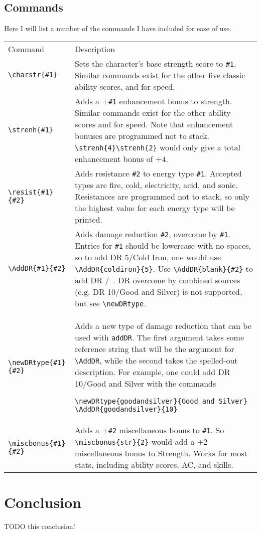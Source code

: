 \documentclass[oneside]{article}
\begin{document}
\subsection{Commands}
Here I will list a number of the commands I have included for ease of use.
\begin{tabular}{lp{8cm}}
Command & Description\\
\verb|\charstr{#1}| & Sets the character's base strength score to \verb|#1|. Similar commands exist for the other five classic ability scores, and for speed.\\
\verb|\strenh{#1}| & Adds a +\verb|#1| enhancement bonus to strength.  Similar commands exist for the other ability scores and for speed.  Note that enhancement bonuses are programmed not to stack.  \verb|\strenh{4}\strenh{2}| would only give a total enhancement bonus of +4.\\
\verb|\resist{#1}{#2}| & Adds resistance \verb|#2| to energy type \verb|#1|.  Accepted types are fire, cold, electricity, acid, and sonic.  Resistances are programmed not to stack, so only the highest value for each energy type will be printed.\\
\verb|\AddDR{#1}{#2}| & Adds damage reduction \verb|#2|, overcome by \verb|#1|. Entries for \verb|#1| should be lowercase with no spaces, so to add DR 5/Cold Iron, one would use \verb|\AddDR{coldiron}{5}|.  Use \verb|\AddDR{blank}{#2}| to add DR /--. DR overcome by combined sources (e.g. DR 10/Good and Silver) is not supported, but see \verb|\newDRtype|.\\
\verb|\newDRtype{#1}{#2}| & Adds a new type of damage reduction that can be used with \verb|addDR|. The first argument takes some reference string that will be the argument for \verb|\AddDR|, while the second takes the spelled-out description.  For example, one could add DR 10/Good and Silver with the commands
\begin{verbatim}
\newDRtype{goodandsilver}{Good and Silver}
\AddDR{goodandsilver}{10}
\end{verbatim}\\
\verb|\miscbonus{#1}{#2}| & Adds a +\verb|#2| miscellaneous bonus to \verb|#1|.  So \verb|\miscbonus{str}{2}| would add a +2 miscellaneous bonus to Strength. Works for most stats, including ability scores, AC, and skills.
\end{tabular}
\section{Conclusion}
\label{sec:conclusion}

TODO this conclusion!
\end{document}
